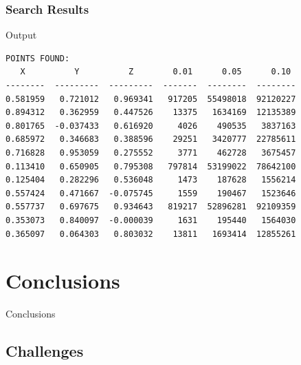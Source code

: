 \documentclass[usernames,dvipsnames]{beamer}
\begin{document}

\begin{frame}[fragile]	
	\frametitle{Search Results}
	
        	\begin{block}{Output}
\begin{verbatim}
POINTS FOUND:
   X          Y          Z        0.01      0.05      0.10
--------  ---------  ---------  -------  --------  --------
0.581959   0.721012   0.969341   917205  55498018  92120227
0.894312   0.362959   0.447526    13375   1634169  12135389
0.801765  -0.037433   0.616920     4026    490535   3837163
0.685972   0.346683   0.388596    29251   3420777  22785611
0.716828   0.953059   0.275552     3771    462728   3675457
0.113410   0.650905   0.795308   797814  53199022  78642100
0.125404   0.282296   0.536048     1473    187628   1556214
0.557424   0.471667  -0.075745     1559    190467   1523646
0.557737   0.697675   0.934643   819217  52896281  92109359
0.353073   0.840097  -0.000039     1631    195440   1564030
0.365097   0.064303   0.803032    13811   1693414  12855261
\end{verbatim}
        	\end{block}
\end{frame}


\section{Conclusions}

\begin{frame}	
	\begin{Huge}
		\begin{center}
			Conclusions
		\end{center}
	\end{Huge}
\end{frame}

\subsection{Challenges}
\end{document}
